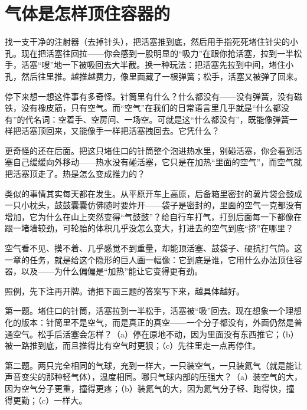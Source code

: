 \chapter{气体是怎样顶住容器的}


\begin{mainline}
找一支干净的注射器（去掉针头），把活塞推到底，然后用手指死死堵住针尖的小孔。现在把活塞往回拉——你会感到一股明显的“吸力”在跟你抢活塞，拉到一半松手，活塞“嗖”地一下被吸回去大半截。换一种玩法：把活塞先拉到中间，堵住小孔，然后往里推。越推越费力，像里面藏了一根弹簧；松手，活塞又被弹了回来。

停下来想一想这件事有多奇怪。针筒里有什么？什么都没有——没有弹簧，没有磁铁，没有橡皮筋，只有空气。而“空气”在我们的日常语言里几乎就是“什么都没有”的代名词：空着手、空房间、一场空。可就是这“什么都没有”，既能像弹簧一样把活塞顶回来，又能像手一样把活塞拽回去。它凭什么？

更奇怪的还在后面。把这只堵住口的针筒整个泡进热水里，别碰活塞，你会看到活塞自己缓缓向外移动——热水没有碰活塞，它只是在加热“里面的空气”，而空气就把活塞顶走了。热是怎么变成推力的？

类似的事情其实每天都在发生。从平原开车上高原，后备箱里密封的薯片袋会鼓成一只小枕头，鼓鼓囊囊仿佛随时要炸开——袋子是密封的，里面的空气一克都没有增加，它为什么在山上突然变得“气鼓鼓”？给自行车打气，打到后面每一下都像在跟一堵墙较劲，可轮胎的体积几乎没怎么变大，打进去的空气到底“挤”在哪里？

空气看不见、摸不着、几乎感觉不到重量，却能顶活塞、鼓袋子、硬抗打气筒。这一章的任务，就是给这个隐形的巨人画一幅像：它到底是谁，它用什么办法顶住容器，以及——为什么偏偏是“加热”能让它变得更有劲。
\end{mainline}


照例，先下注再开牌。请把下面三题的答案写下来，越具体越好。

第一题。堵住口的针筒，活塞拉到一半松手，活塞被“吸”回去。现在想象一个理想化的版本：针筒里不是空气，而是真正的真空——一个分子都没有，外面仍然是普通空气。松手后活塞会怎样？（a）停在原地不动，因为里面没有东西推它；（b）被一路推到底，而且推得比有空气时更狠；（c）先往里走一点再停住。

第二题。两只完全相同的气球，充到一样大，一只装空气，一只装氦气（就是能让声音变尖的那种轻气体），温度相同。哪只气球内部的压强大？（a）装空气的大，因为空气分子更重，撞得更疼；（b）装氦气的大，因为氦气分子轻、跑得快，撞得更勤；（c）一样大。

